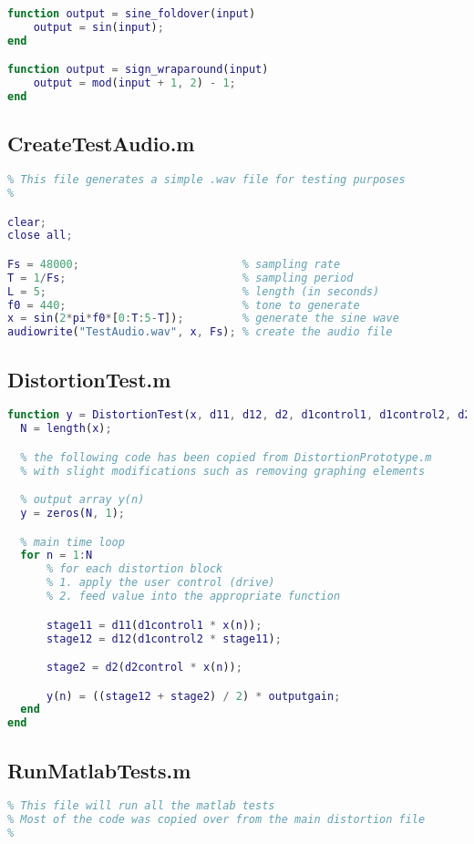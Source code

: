 \documentclass{article}
\begin{document}
\begin{appendix}
\begin{lstlisting}[language=MATLAB]
function output = sine_foldover(input)
    output = sin(input);
end

function output = sign_wraparound(input)
    output = mod(input + 1, 2) - 1;
end
\end{lstlisting}

\pagebreak
\subsection{CreateTestAudio.m}
\begin{lstlisting}[language=MATLAB]
%
% This file generates a simple .wav file for testing purposes
%

clear;
close all;

Fs = 48000;                         % sampling rate
T = 1/Fs;                           % sampling period
L = 5;                              % length (in seconds)
f0 = 440;                           % tone to generate
x = sin(2*pi*f0*[0:T:5-T]);         % generate the sine wave
audiowrite("TestAudio.wav", x, Fs); % create the audio file

\end{lstlisting}
\subsection{DistortionTest.m}
\begin{lstlisting}[language=MATLAB]
function y = DistortionTest(x, d11, d12, d2, d1control1, d1control2, d2control, outputgain)
  N = length(x);

  % the following code has been copied from DistortionPrototype.m
  % with slight modifications such as removing graphing elements

  % output array y(n)
  y = zeros(N, 1);

  % main time loop
  for n = 1:N
      % for each distortion block
      % 1. apply the user control (drive)
      % 2. feed value into the appropriate function

      stage11 = d11(d1control1 * x(n));
      stage12 = d12(d1control2 * stage11);

      stage2 = d2(d2control * x(n));

      y(n) = ((stage12 + stage2) / 2) * outputgain;
  end
end
\end{lstlisting}

\subsection{RunMatlabTests.m}
\begin{lstlisting}[language=MATLAB]
%
% This file will run all the matlab tests
% Most of the code was copied over from the main distortion file
%


\end{lstlisting}
\end{appendix}
\end{document}
